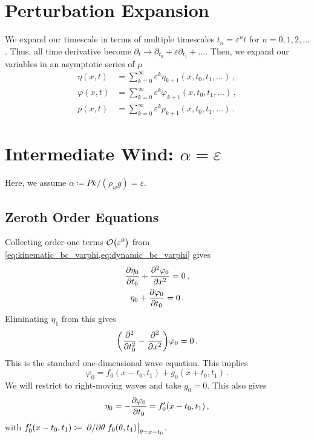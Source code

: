 \documentclass{jfm}
\renewcommand*{\epsilon}{\varepsilon}
\begin{document}
\section{Perturbation Expansion}
\label{sec:shallow_water}
We expand our timescale in terms of multiple timescales $t_n =
\epsilon^n t$ for $n= 0,1,2,\ldots$.
Thus, all time derivative become $\partial_t \to \partial_{t_0} +
\epsilon \partial_{t_1} + \ldots$.
Then, we expand our variables in an asymptotic series of $\mu$
\begin{align}
  \eta(x,t) &= \sum_{k=0}^{\infty} \epsilon^k
    \eta_{k+1}(x,t_0,t_1,\ldots) \,, \\
  \varphi(x,t) &= \sum_{k=0}^{\infty} \epsilon^k
    \varphi_{k+1}(x,t_0,t_1,\ldots) \,, \\
  p(x,t) &= \sum_{k=0}^{\infty} \epsilon^k p_{k+1}(x,t_0,t_1,\ldots)
    \,.
\end{align}

\section{\label{sec:intermediate} \texorpdfstring{Intermediate Wind:
$\alpha = \epsilon$}{Intermediate Wind}}
Here, we assume $\alpha \coloneqq P k/(\rho_w g) = \epsilon$.
\subsection{Zeroth Order Equations}
Collecting order-one terms $\order{\epsilon^0}$ from
\cref{eq:kinematic_bc_varphi,eq:dynamic_bc_varphi} gives
\begin{gather}
  \pdv{\eta_0}{t_0} + \pdv[2]{\varphi_0}{x} = 0 \,, \\
  \eta_0 + \pdv{\varphi_0}{t_0} = 0 \,.
\end{gather}
Eliminating $\eta_1$ from this gives
\begin{equation}
  \pqty{\pdv[2]{t_0} - \pdv[2]{x} } \varphi_0 = 0 \,.
  \label{eq:wave_eq}
\end{equation}
This is the standard one-dimensional wave equation.
This implies
\begin{equation}
  \varphi_0 = f_0(x-t_0,t_1) + g_0(x+t_0,t_1) \,.
  \label{eq:phi0_sol}
\end{equation}
We will restrict to right-moving waves and take $g_0 = 0$.
This also gives
\begin{equation}
  \eta_0 = - \pdv{\varphi_0}{t_0} = f_0'(x-t_0,t_1) \,,
  \label{eq:eta0_sol}
\end{equation}
with $f_0'(x-t_0,t_1) \coloneqq \eval{\pdv*{\theta}
f_0(\theta,t_1)}_{\theta = x-t_0}$.
\end{document}
